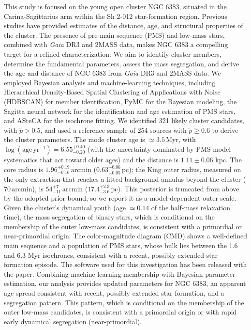 \documentclass{aa}
\begin{document}
  \abstract
   {This study is focused on the young open cluster NGC 6383, situated in the Carina-Sagittarius arm within the Sh 2-012 star-formation region. Previous studies have provided estimates of the distance, age, and structural properties of the cluster. The presence of pre-main sequence (PMS) and low-mass stars, combined with \textit{Gaia} DR3 and 2MASS data, makes NGC 6383 a compelling target for a refined characterization.}
   {We aim to identify cluster members, determine the fundamental parameters, assess the mass segregation, and derive the age and distance of NGC 6383 from \textit{Gaia} DR3 and 2MASS data.}
   {We employed Bayesian analysis and machine-learning techniques, including Hierarchical Density-Based Spatial Clustering of Applications with Noise (HDBSCAN) for member identification, PyMC for the Bayesian modeling, the Sagitta neural network for the identification and age estimation of PMS stars, and ASteCA for the isochrone fitting.}   
   {We identified 321 likely cluster candidates, with $\tilde{p}>0.5$, and used a reference sample of 254 sources with $\tilde{p}\geq0.6$ to derive the cluster parameters. The mode cluster age is $\simeq3.5\,\mathrm{Myr}$, with $\log(\mathrm{age}\,\mathrm{yr^{-1}}) = 6.55^{+0.40}_{-0.20}$ (with the uncertainty dominated by PMS model systematics that act toward older ages) and the distance is $1.11\pm 0.06$ kpc. The core radius is $1.96^{+0.19}_{-0.16}\,\mathrm{arcmin}$ ($0.63^{+0.06}_{-0.05}\,\mathrm{pc}$); the King outer radius, measured on the only extraction that reaches a fitted background annulus beyond the cluster ($70\,\mathrm{arcmin}$), is $54^{+7}_{-11}\,\mathrm{arcmin}$ ($17.4^{+2.3}_{-3.6}\,\mathrm{pc}$). This posterior is truncated from above by the adopted prior bound, so we report it as a model-dependent outer scale. Given the cluster's dynamical youth (age $\simeq0.14$ of the half-mass relaxation time), the mass segregation of binary stars, which is conditional on the membership of the outer low-mass candidates, is consistent with a primordial or near-primordial origin. The color-magnitude diagram (CMD) shows a well-defined main sequence and a population of PMS stars, whose bulk lies between the 1.6 and 6.3 Myr isochrones, consistent with a recent, possibly extended star formation episode. The software used for this investigation has been released with the paper.}
   {Combining machine-learning membership with Bayesian parameter estimation, our analysis provides updated parameters for NGC 6383, an apparent age spread consistent with recent, possibly extended star formation, and a segregation pattern. This pattern, which is conditional on the membership of the outer low-mass candidates, is consistent with a primordial origin or with rapid early dynamical segregation (near-primordial).}
\end{document}
